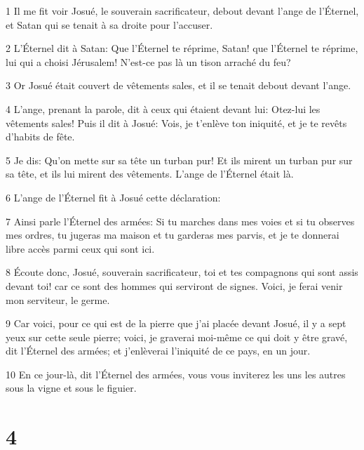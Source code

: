 \par 1 Il me fit voir Josué, le souverain sacrificateur, debout devant l'ange de l'Éternel, et Satan qui se tenait à sa droite pour l'accuser.
\par 2 L'Éternel dit à Satan: Que l'Éternel te réprime, Satan! que l'Éternel te réprime, lui qui a choisi Jérusalem! N'est-ce pas là un tison arraché du feu?
\par 3 Or Josué était couvert de vêtements sales, et il se tenait debout devant l'ange.
\par 4 L'ange, prenant la parole, dit à ceux qui étaient devant lui: Otez-lui les vêtements sales! Puis il dit à Josué: Vois, je t'enlève ton iniquité, et je te revêts d'habits de fête.
\par 5 Je dis: Qu'on mette sur sa tête un turban pur! Et ils mirent un turban pur sur sa tête, et ils lui mirent des vêtements. L'ange de l'Éternel était là.
\par 6 L'ange de l'Éternel fit à Josué cette déclaration:
\par 7 Ainsi parle l'Éternel des armées: Si tu marches dans mes voies et si tu observes mes ordres, tu jugeras ma maison et tu garderas mes parvis, et je te donnerai libre accès parmi ceux qui sont ici.
\par 8 Écoute donc, Josué, souverain sacrificateur, toi et tes compagnons qui sont assis devant toi! car ce sont des hommes qui serviront de signes. Voici, je ferai venir mon serviteur, le germe.
\par 9 Car voici, pour ce qui est de la pierre que j'ai placée devant Josué, il y a sept yeux sur cette seule pierre; voici, je graverai moi-même ce qui doit y être gravé, dit l'Éternel des armées; et j'enlèverai l'iniquité de ce pays, en un jour.
\par 10 En ce jour-là, dit l'Éternel des armées, vous vous inviterez les uns les autres sous la vigne et sous le figuier.

\chapter{4}

